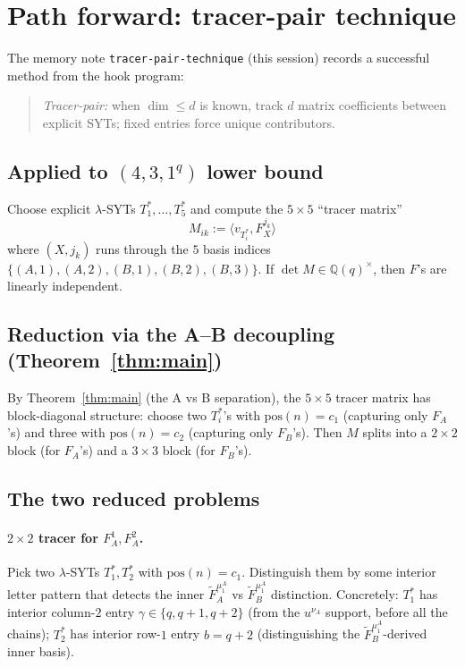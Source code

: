 \documentclass[11pt]{article}
\theoremstyle{definition}
\begin{document}
\section{Path forward: tracer-pair technique}\label{sec:tracer}

The memory note \texttt{tracer-pair-technique} (this session) records
a successful method from the hook program:

\begin{quote}\emph{Tracer-pair:} when $\dim \le d$ is known, track $d$
matrix coefficients between explicit SYTs; fixed entries force unique
contributors.\end{quote}

\subsection{Applied to $(4, 3, 1^q)$ lower bound}

Choose explicit $\lambda$-SYTs $T^*_1, \ldots, T^*_5$ and compute
the $5 \times 5$ ``tracer matrix''
\[
   M_{ik} := \langle v_{T^*_i}, F_X^{j_k}\rangle
\]
where $(X, j_k)$ runs through the $5$ basis indices
$\{(A, 1), (A, 2), (B, 1), (B, 2), (B, 3)\}$. If $\det M \in
\mathbb{Q}(q)^\times$, then $F$'s are linearly independent.

\subsection{Reduction via the A--B decoupling (Theorem~\ref{thm:main})}

By Theorem~\ref{thm:main} (the A vs B separation), the
$5 \times 5$ tracer matrix has block-diagonal structure: choose two
$T^*_i$'s with $\mathrm{pos}(n) = c_1$ (capturing only $F_A$'s) and
three with $\mathrm{pos}(n) = c_2$ (capturing only $F_B$'s). Then $M$
splits into a $2 \times 2$ block (for $F_A$'s) and a $3 \times 3$
block (for $F_B$'s).

\subsection{The two reduced problems}

\paragraph{$2 \times 2$ tracer for $F_A^1, F_A^2$.}
Pick two $\lambda$-SYTs $T^*_1, T^*_2$ with $\mathrm{pos}(n) = c_1$.
Distinguish them by some interior letter pattern that detects the
inner $\widetilde F_A^{\mu_1^A}$ vs $\widetilde F_B^{\mu_1^A}$
distinction. Concretely: $T^*_1$ has interior column-$2$ entry
$\gamma \in \{q, q+1, q+2\}$ (from the $u^{\nu_A}$ support, before
all the chains); $T^*_2$ has interior row-$1$ entry $b = q+2$
(distinguishing the $\widetilde F_B^{\mu_1^A}$-derived inner basis).
\end{document}
